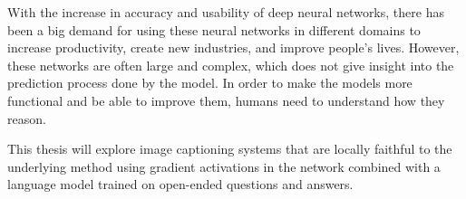 \label{sec:abstract}

\begin{comment}
The abstract is often the first text the reader looks at. Thus, it should be very well written, concise and to-the-point - with the focus of SELLING your work. It is therefore often written at the very end, when you have all details of your work. Usually, we recommend something like this: i) A sentence or three about the background of the challenge you are addressing, which then leads to your “problem statement” (written as just a sentence); ii) Some text describing what you have done in your research, what have you developed, etc.; iii) A small overview of your main results and conclusions - what are the main take-aways from your thesis.

Note also that the abstract is a teaser, and it should therefore not be too long: Fast to read, fast to get to the point. We often recommend keeping it on one page.
\end{comment}


With the increase in accuracy and usability of deep neural networks, there has been a big demand for using these neural networks in different domains to increase productivity, create new industries, and improve people's lives. 
However, these networks are often large and complex, which does not give insight into the prediction process done by the model. 
In order to make the models more functional and be able to improve them, humans need to understand how they reason. 

This thesis will explore image captioning systems that are locally faithful to the underlying method using gradient activations in the network combined with a language model trained on open-ended questions and answers.